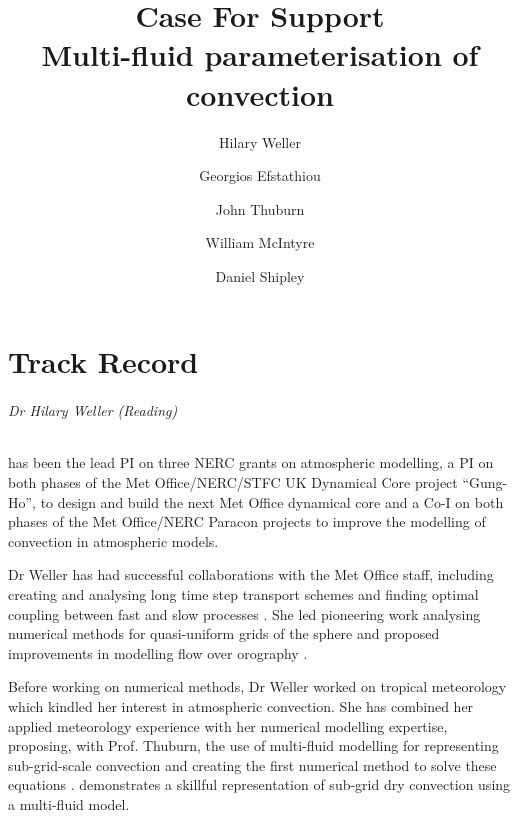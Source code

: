 \documentclass[11pt,a4paper]{article}
\begin{document}
\title{Case For Support \\ \Large
Multi-fluid parameterisation of convection
}
\author{Hilary Weller \and Georgios Efstathiou \and John Thuburn \and William McIntyre \and Daniel Shipley}
\date{}
\maketitle

\part{Track Record}

\paragraph*{Dr Hilary Weller (Reading)} has been the lead PI on three NERC grants on atmospheric modelling, a PI on both phases of the Met Office/NERC/STFC UK Dynamical Core project ``Gung-Ho'', to design and build the next Met Office dynamical core and a Co-I on both phases of the Met Office/NERC Paracon projects to improve the modelling of convection in atmospheric models.

Dr Weller has had successful collaborations with the Met Office staff, including creating and analysing long time step transport schemes \cite[]{CWPS17,SWMD17} and finding optimal coupling between fast and slow processes \cite[][]{WLW13}. She led pioneering work analysing numerical methods for quasi-uniform grids of the sphere \cite[e.g.][]{WWF09,Wel12,WTC12} and proposed improvements in modelling flow over orography \cite[]{WS14}. 

Before working on numerical methods, Dr Weller worked on tropical meteorology \cite[e.g.][]{LGWS09} which kindled her interest in atmospheric convection. She has combined her applied meteorology experience with her numerical modelling expertise, proposing, with Prof. Thuburn, the use of multi-fluid modelling for representing sub-grid-scale convection \cite[]{TWV+18} and creating the first numerical method to solve these equations \cite[]{WM19}. \cite{WMS20} demonstrates a skillful representation of sub-grid dry convection using a multi-fluid model.
\end{document}
